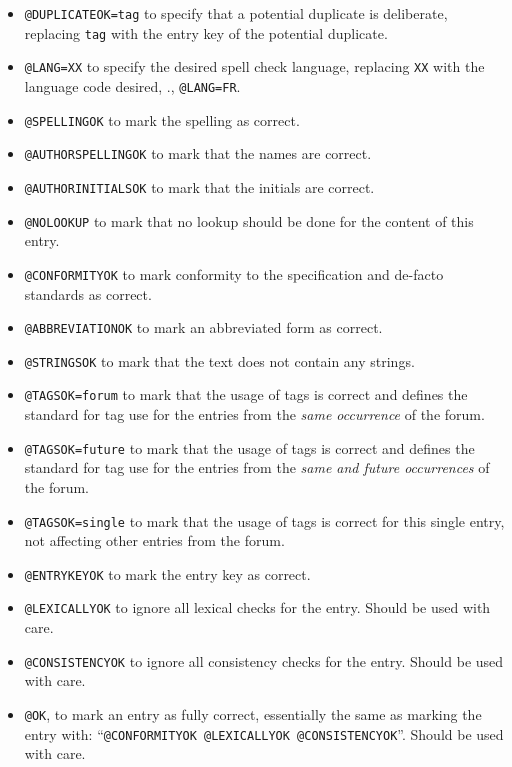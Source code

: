 \begin{itemize}
\item \texttt{@DUPLICATEOK=tag} to specify that a potential duplicate
  is deliberate, replacing \texttt{tag} with the entry key of the
  potential duplicate.
\item \texttt{@LANG=XX} to specify the desired spell check language,
  replacing \texttt{XX} with the language code desired, \eg.,
  \texttt{@LANG=FR}.
\item \texttt{@SPELLINGOK} to mark the spelling as correct.
\item \texttt{@AUTHORSPELLINGOK} to mark that the names are correct.
\item \texttt{@AUTHORINITIALSOK} to mark that the initials are correct.
\item \texttt{@NOLOOKUP} to mark that no lookup should be done for
  the content of this entry.
\item \texttt{@CONFORMITYOK} to mark conformity to the specification
  and de-facto standards as correct.
\item \texttt{@ABBREVIATIONOK} to mark an abbreviated form as correct.
\item \texttt{@STRINGSOK} to mark that the text does not contain any
  strings.
\item \texttt{@TAGSOK=forum} to mark that the usage of tags is correct and
  defines the standard for tag use for the entries from the \emph{same
  occurrence} of the forum.
\item \texttt{@TAGSOK=future} to mark that the usage of tags is
  correct and defines the standard for tag use for the entries from
  the \emph{same and future occurrences} of the forum.
\item \texttt{@TAGSOK=single} to mark that the usage of tags is
  correct for this single entry, not affecting other entries from the
  forum.
\item \texttt{@ENTRYKEYOK} to mark the entry key as correct.
\item \texttt{@LEXICALLYOK} to ignore all lexical checks for the
  entry.  Should be used with care.
\item \texttt{@CONSISTENCYOK} to ignore all consistency checks for the
  entry.  Should be used with care.
\item \texttt{@OK}, to mark an entry as fully correct, essentially the
  same as marking the entry with: ``\texttt{@CONFORMITYOK @LEXICALLYOK
    @CONSISTENCYOK}''.  Should be used with care.
\end{itemize}

